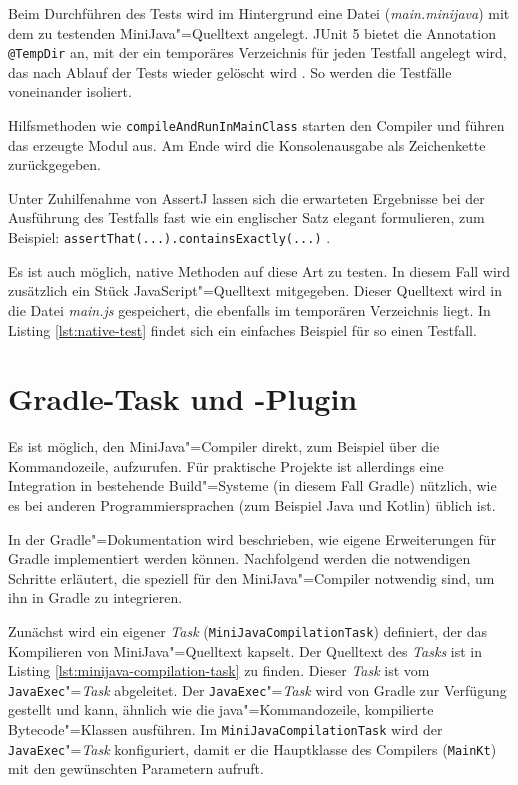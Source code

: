 \pagebreak


Beim Durchführen des Tests wird im Hintergrund eine Datei (\emph{main.minijava}) mit dem zu testenden MiniJava"=Quelltext angelegt. JUnit 5 bietet die Annotation \lstinline{@TempDir} an, mit der ein temporäres Verzeichnis für jeden Testfall angelegt wird, das nach Ablauf der Tests wieder gelöscht wird \cite{JUnit}. So werden die Testfälle voneinander isoliert.

Hilfsmethoden wie \lstinline{compileAndRunInMainClass} starten den Compiler und führen das erzeugte Modul aus. Am Ende wird die Konsolenausgabe als Zeichenkette zurückgegeben.

Unter Zuhilfenahme von AssertJ lassen sich die erwarteten Ergebnisse bei der Ausführung des Testfalls fast wie ein englischer Satz elegant formulieren, zum Beispiel: \lstinline{assertThat(...).containsExactly(...)} \cite{AssertJ}.

Es ist auch möglich, native Methoden auf diese Art zu testen. In diesem Fall wird zusätzlich ein Stück JavaScript"=Quelltext mitgegeben. Dieser Quelltext wird in die Datei \emph{main.js} gespeichert, die ebenfalls im temporären Verzeichnis liegt. In Listing \ref{lst:native-test} findet sich ein einfaches Beispiel für so einen Testfall.



\pagebreak
\section{Gradle-Task und -Plugin}
\label{sec:GradleTask-und-Plugin}

Es ist möglich, den MiniJava"=Compiler direkt, zum Beispiel über die Kommandozeile, aufzurufen. Für praktische Projekte ist allerdings eine Integration in bestehende Build"=Systeme (in diesem Fall Gradle) nützlich, wie es bei anderen Programmiersprachen (zum Beispiel Java und Kotlin) üblich ist.

In der Gradle"=Dokumentation \cite{Gradle} wird beschrieben, wie eigene Erweiterungen für Gradle implementiert werden können. Nachfolgend werden die notwendigen Schritte erläutert, die speziell für den MiniJava"=Compiler notwendig sind, um ihn in Gradle zu integrieren.

Zunächst wird ein eigener \emph{Task} (\lstinline{MiniJavaCompilationTask}) definiert, der das Kompilieren von MiniJava"=Quelltext kapselt. Der Quelltext des \emph{Tasks} ist in Listing \ref{lst:minijava-compilation-task} zu finden. Dieser \emph{Task} ist vom \lstinline{JavaExec}"=\emph{Task} abgeleitet. Der \lstinline{JavaExec}"=\emph{Task} wird von Gradle zur Verfügung gestellt und kann, ähnlich wie die java"=Kommandozeile, kompilierte Bytecode"=Klassen ausführen. Im \lstinline{MiniJavaCompilationTask} wird der \lstinline{JavaExec}"=\emph{Task} konfiguriert, damit er die Hauptklasse des Compilers (\lstinline{MainKt}) mit den gewünschten Parametern aufruft.

